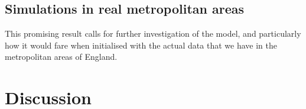\documentclass[../thesis.tex]{subfiles}
\begin{document}
\subsection{Simulations in real metropolitan areas}
This promising result calls for further investigation of the model, and particularly how
it would fare when initialised with the actual data that we have in the metropolitan
areas of England.


\section{Discussion}
\end{document}
